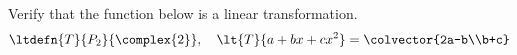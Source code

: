Verify that the function below is a linear transformation.
%
\begin{equation*}
\ltdefn{T}{P_2}{\complex{2}},\quad \lt{T}{a+bx+cx^2}=\colvector{2a-b\\b+c}
\end{equation*}